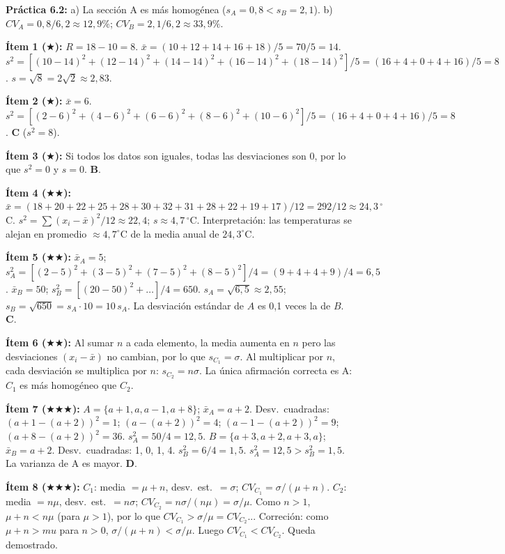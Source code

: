 \documentclass[11pt, letterpaper]{article}
\begin{document}
\textbf{Pr\'actica 6.2:}
a) La secci\'on A es m\'as homog\'enea ($s_A=0{,}8 < s_B=2{,}1$). b) $CV_A=0{,}8/6{,}2\approx12{,}9\%$; $CV_B=2{,}1/6{,}2\approx33{,}9\%$.

\textbf{\'Item 1 ($\bigstar$):}
$R=18-10=8$. $\bar{x}=(10+12+14+16+18)/5=70/5=14$. $s^2=[(10{-}14)^2+(12{-}14)^2+(14{-}14)^2+(16{-}14)^2+(18{-}14)^2]/5=(16+4+0+4+16)/5=8$. $s=\sqrt{8}=2\sqrt{2}\approx2{,}83$.

\textbf{\'Item 2 ($\bigstar$):}
$\bar{x}=6$. $s^2=[(2{-}6)^2+(4{-}6)^2+(6{-}6)^2+(8{-}6)^2+(10{-}6)^2]/5=(16+4+0+4+16)/5=8$. \textbf{C} ($s^2=8$).

\textbf{\'Item 3 ($\bigstar$):} Si todos los datos son iguales, todas las desviaciones son 0, por lo que $s^2=0$ y $s=0$. \textbf{B}.

\textbf{\'Item 4 ($\bigstar\bigstar$):}
$\bar{x} = (18+20+22+25+28+30+32+31+28+22+19+17)/12=292/12\approx24{,}3\,^\circ$C.
$s^2 = \sum(x_i-\bar{x})^2/12 \approx 22{,}4$; $s\approx4{,}7\,^\circ$C. Interpretaci\'on: las temperaturas se alejan en promedio $\approx4{,}7^\circ$C de la media anual de $24{,}3^\circ$C.

\textbf{\'Item 5 ($\bigstar\bigstar$):}
$\bar{x}_A=5$; $s_A^2=[(2-5)^2+(3-5)^2+(7-5)^2+(8-5)^2]/4=(9+4+4+9)/4=6{,}5$.
$\bar{x}_B=50$; $s_B^2=[(20-50)^2+\ldots]/4=650$.
$s_A=\sqrt{6{,}5}\approx2{,}55$; $s_B=\sqrt{650}=s_A\cdot10=10\,s_A$.
La desviaci\'on est\'andar de $A$ es 0{,}1 veces la de $B$. \textbf{C}.

\textbf{\'Item 6 ($\bigstar\bigstar$):}
Al sumar $n$ a cada elemento, la media aumenta en $n$ pero las desviaciones $(x_i-\bar{x})$ no cambian, por lo que $s_{C_1}=\sigma$.
Al multiplicar por $n$, cada desviaci\'on se multiplica por $n$: $s_{C_2}=n\sigma$.
La \'unica afirmaci\'on correcta es A: $C_1$ es m\'as homog\'eneo que $C_2$.

\textbf{\'Item 7 ($\bigstar\bigstar\bigstar$):}
$A=\{a{+}1,a,a{-}1,a{+}8\}$; $\bar{x}_A=a+2$.
Desv.\ cuadradas: $(a{+}1{-}(a{+}2))^2=1$; $(a-(a+2))^2=4$; $(a{-}1{-}(a{+}2))^2=9$; $(a{+}8{-}(a{+}2))^2=36$. $s_A^2=50/4=12{,}5$.
$B=\{a{+}3,a{+}2,a{+}3,a\}$; $\bar{x}_B=a+2$.
Desv.\ cuadradas: 1, 0, 1, 4. $s_B^2=6/4=1{,}5$.
$s_A^2=12{,}5>s_B^2=1{,}5$. La varianza de A es mayor. \textbf{D}.

\textbf{\'Item 8 ($\bigstar\bigstar\bigstar$):}
$C_1$: media $=\mu+n$, desv.\ est.\ $=\sigma$; $CV_{C_1}=\sigma/(\mu+n)$.
$C_2$: media $=n\mu$, desv.\ est.\ $=n\sigma$; $CV_{C_2}=n\sigma/(n\mu)=\sigma/\mu$.
Como $n>1$, $\mu+n<n\mu$ (para $\mu>1$), por lo que $CV_{C_1}>\sigma/\mu=CV_{C_2}$... Correci\'on: como $\mu+n>mu$ para $n>0$, $\sigma/(\mu+n)<\sigma/\mu$. Luego $CV_{C_1}<CV_{C_2}$. Queda demostrado.
\end{document}
